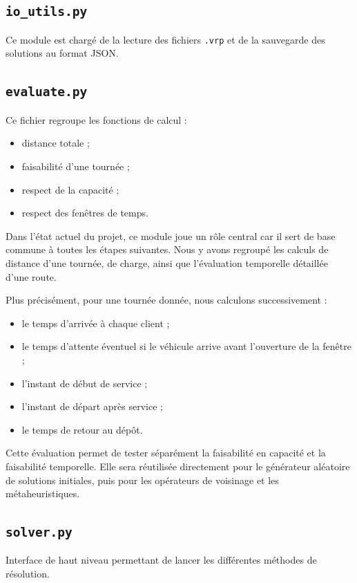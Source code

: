 \documentclass[11pt,a4paper]{article}
\begin{document}
\subsection{\texttt{io\_utils.py}}
Ce module est chargé de la lecture des fichiers \texttt{.vrp} et de la sauvegarde des solutions au format JSON.

\subsection{\texttt{evaluate.py}}
Ce fichier regroupe les fonctions de calcul :
\begin{itemize}
    \item distance totale ;
    \item faisabilité d'une tournée ;
    \item respect de la capacité ;
    \item respect des fenêtres de temps.
\end{itemize}

Dans l'état actuel du projet, ce module joue un rôle central car il sert de base commune à toutes les étapes suivantes. Nous y avons regroupé les calculs de distance d'une tournée, de charge, ainsi que l'évaluation temporelle détaillée d'une route.

Plus précisément, pour une tournée donnée, nous calculons successivement :
\begin{itemize}
    \item le temps d'arrivée à chaque client ;
    \item le temps d'attente éventuel si le véhicule arrive avant l'ouverture de la fenêtre ;
    \item l'instant de début de service ;
    \item l'instant de départ après service ;
    \item le temps de retour au dépôt.
\end{itemize}

Cette évaluation permet de tester séparément la faisabilité en capacité et la faisabilité temporelle. Elle sera réutilisée directement pour le générateur aléatoire de solutions initiales, puis pour les opérateurs de voisinage et les métaheuristiques.

\subsection{\texttt{solver.py}}
Interface de haut niveau permettant de lancer les différentes méthodes de résolution.
\end{document}
